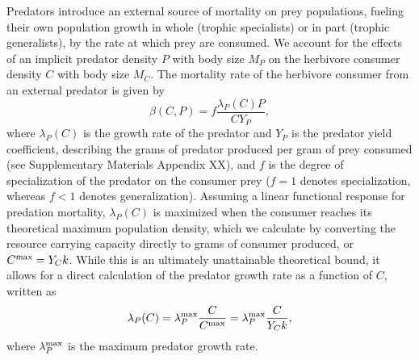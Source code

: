 \documentclass[]{rsos}%
\begin{document}
Predators introduce an external source of mortality on prey populations, fueling their own population growth in whole (trophic specialists) or in part (trophic generalists), by the rate at which prey are consumed.
We account for the effects of an implicit predator density $P$ with body size $M_P$ on the herbivore consumer density $C$ with body size $M_C$.
The mortality rate of the herbivore consumer from an external predator is given by 
\begin{equation}
\beta(C,P)=f\frac{\lambda_P(C) P}{C Y_P}, 
\end{equation}
where $\lambda_P(C)$ is the growth rate of the predator and $Y_P$ is the predator yield coefficient, describing the grams of predator produced per gram of prey consumed (see Supplementary Materials Appendix XX), and $f$ is the degree of specialization of the predator on the consumer prey ($f=1$ denotes specialization, whereas $f<1$ denotes generalization).
Assuming a linear functional response for predation mortality, $\lambda_P(C)$ is maximized when the consumer reaches its theoretical maximum population density, which we calculate by converting the resource carrying capacity directly to grams of consumer produced, or $C^{\rm max} = Y_C k$.
While this is an ultimately unattainable theoretical bound, it allows for a direct calculation of the predator growth rate as a function of $C$, written as
\begin{equation}
    \lambda_P(C) = \lambda_P^{\rm max}\frac{C}{C^{\rm max}} = \lambda_P^{\rm max}\frac{C}{Y_C k},
    \label{eq:predfunction}
\end{equation}
where $\lambda_P^{\rm max}$ is the maximum predator growth rate. 
\end{document}
